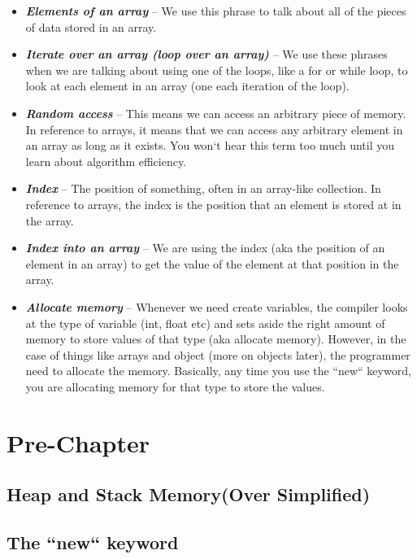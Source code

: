 \documentclass[11]{article}
\begin{document}
\begin{itemize}
  \item \textbf{\textit{Elements of an array}} -- We use this phrase to talk about all of the pieces of data stored in an array.
  
  \item \textbf{\textit{Iterate over an array (loop over an array)}} -- We use these phrases when we are talking about using one of the loops, like a for or while loop, to look at each element in an array (one each iteration of the loop).
  
  \item \textbf{\textit{Random access}} -- This means we can access an arbitrary piece of memory. In reference to arrays, it means that we can access any arbitrary element in an array as long as it exists. You won`t hear this term too much until you learn about algorithm efficiency.
  
  \item \textbf{\textit{Index}} -- The position of something, often in an array-like collection. In reference to arrays, the index is the position that an element is stored at in the array.
  
  \item \textbf{\textit{Index into an array}} -- We are using the index (aka the position of an element in an array) to get the value of the element at that position in the array.
  
  \item \textbf{\textit{Allocate memory}} -- Whenever we need create variables, the compiler looks at the type of variable  (int, float etc) and sets aside the right amount of memory to store values of that type (aka allocate memory). However, in the case of things like arrays and object (more on objects later), the programmer need to allocate the memory. Basically, any time you use the ``new`` keyword, you are allocating memory for that type to store the values.
  
\end{itemize}
\section{Pre-Chapter}
\subsection{Heap and Stack Memory(Over Simplified)}
\label{sec:heap}

\subsection{The ``new`` keyword}
\end{document}
